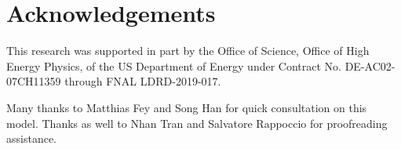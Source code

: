 \documentclass{article}
\begin{document}
\section{Acknowledgements}

This research was supported in part by the Office of Science, Office of
High Energy Physics, of the US Department of Energy under Contract No. DE-AC02-07CH11359 through FNAL LDRD-2019-017.

Many thanks to Matthias Fey and Song Han for quick consultation on this model.
Thanks as well to Nhan Tran and Salvatore Rappoccio for proofreading assistance.

  
 
\end{document}
